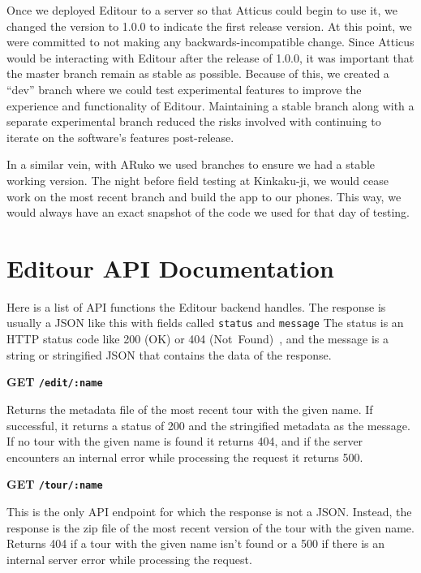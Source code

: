 \documentclass[a4paper, 10pt, american, titlepage]{article}
\newenvironment{indented}[1]%
{\begin{list}{}%
	{\setlength{\leftmargin}{#1}}%
	\item[]%
}
{\end{list}}
\begin{document}
Once we deployed Editour to a server so that Atticus could begin to use it, we
changed the version to 1.0.0 to indicate the first release version. At this
point, we were committed to not making any backwards-incompatible change. Since
Atticus would be interacting with Editour after the release of 1.0.0, it was
important that the master branch remain as stable as possible. Because of this,
we created a ``dev'' branch where we could test experimental features to improve
the experience and functionality of Editour. Maintaining a stable branch along
with a separate experimental branch reduced the risks involved with continuing
to iterate on the software's features post-release.

In a similar vein, with ARuko we used branches to ensure we had a stable working
version. The night before field testing at Kinkaku-ji, we would cease work on
the most recent branch and build the app to our phones. This way, we would
always have an exact snapshot of the code we used for that day of testing.

\clearpage

\section{Editour API Documentation}
\label{sec:editourAPIDocumentation}

Here is a list of API functions the Editour backend handles. The response is
usually a JSON like this with fields called \texttt{status} and \texttt{message}
The status is an HTTP status code like 200 (OK) or 404
(Not~Found)~\autocite{rfc7231}, and the message is a string or stringified JSON
that contains the data of the response.

\noindent\textbf{GET \texttt{/edit/:name}}

\begin{indented}{1cm}
	Returns the metadata file of the most recent tour with the given name. If
	successful, it returns a status of 200 and the stringified metadata as the
	message. If no tour with the given name is found it returns 404, and if the
	server encounters an internal error while processing the request it returns
	500.
\end{indented}

\noindent\textbf{GET \texttt{/tour/:name}}

\begin{indented}{1cm}
	This is the only API endpoint for which the response is not a JSON. Instead,
	the response is the zip file of the most recent version of the tour with the
	given name. Returns 404 if a tour with the given name isn't found or a 500
	if there is an internal server error while processing the request.
\end{indented}
\end{document}
